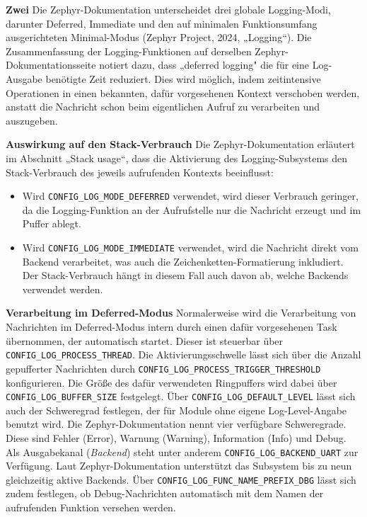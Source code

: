 \textbf{Zwei }Die Zephyr-Dokumentation unterscheidet drei globale Logging-Modi, darunter Deferred, Immediate und den auf minimalen Funktionsumfang ausgerichteten Minimal-Modus (Zephyr Project, 2024, „Logging“). Die Zusammenfassung der Logging-Funktionen auf derselben Zephyr-Dokumentationsseite notiert dazu, dass „deferred logging" die für eine Log-Ausgabe benötigte Zeit reduziert. Dies wird möglich, indem zeitintensive Operationen in einen bekannten, dafür vorgesehenen Kontext verschoben werden, anstatt die Nachricht schon beim eigentlichen Aufruf zu verarbeiten und auszugeben.

\textbf{Auswirkung auf den Stack-Verbrauch} Die Zephyr-Dokumentation erläutert im Abschnitt „Stack usage“, dass die Aktivierung des Logging-Subsystems den Stack-Verbrauch des jeweils aufrufenden Kontexts beeinflusst:

\begin{itemize}
\item Wird \lstinline[style=fileinline]|CONFIG_LOG_MODE_DEFERRED| verwendet, wird dieser Verbrauch geringer, da die Logging-Funktion an der Aufrufstelle nur die Nachricht erzeugt und im Puffer ablegt.
\item Wird \lstinline[style=fileinline]|CONFIG_LOG_MODE_IMMEDIATE| verwendet, wird die Nachricht direkt vom Backend verarbeitet, was auch die Zeichenketten-Formatierung inkludiert. Der Stack-Verbrauch hängt in diesem Fall auch davon ab, welche Backends verwendet werden.
\end{itemize}
\textbf{Verarbeitung im Deferred-Modus} Normalerweise wird die Verarbeitung von Nachrichten im Deferred-Modus intern durch einen dafür vorgesehenen Task übernommen, der automatisch startet. Dieser ist steuerbar über \lstinline[style=fileinline]|CONFIG_LOG_PROCESS_THREAD|. Die Aktivierungsschwelle lässt sich über die Anzahl gepufferter Nachrichten durch \lstinline[style=fileinline]|CONFIG_LOG_PROCESS_TRIGGER_THRESHOLD| konfigurieren. Die Größe des dafür verwendeten Ringpuffers wird dabei über \lstinline[style=fileinline]|CONFIG_LOG_BUFFER_SIZE| festgelegt. Über \lstinline[style=fileinline]|CONFIG_LOG_DEFAULT_LEVEL| lässt sich auch der Schweregrad festlegen, der für Module ohne eigene Log-Level-Angabe benutzt wird. Die Zephyr-Dokumentation nennt vier verfügbare Schweregrade. Diese sind Fehler (Error), Warnung (Warning), Information (Info) und Debug. Als Ausgabekanal (\emph{Backend}) steht unter anderem \lstinline[style=fileinline]|CONFIG_LOG_BACKEND_UART| zur Verfügung. Laut Zephyr-Dokumentation unterstützt das Subsystem bis zu neun gleichzeitig aktive Backends. Über \lstinline[style=fileinline]|CONFIG_LOG_FUNC_NAME_PREFIX_DBG| lässt sich zudem festlegen, ob Debug-Nachrichten automatisch mit dem Namen der aufrufenden Funktion versehen werden.


